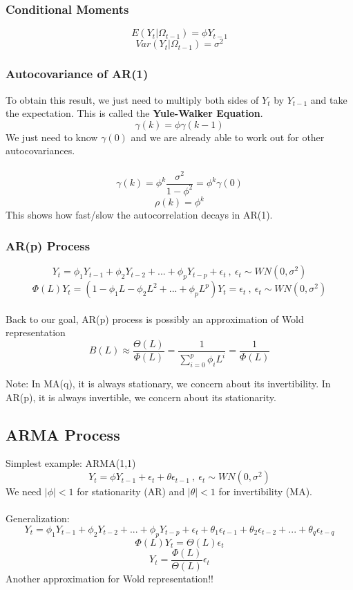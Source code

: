 \documentclass{article}
\begin{document}
\subsubsection{Conditional Moments}
$$E(Y_t|\Omega_{t-1}) = \phi Y_{t-1}$$
$$Var(Y_t|\Omega_{t-1}) = \sigma^2$$

\subsubsection{Autocovariance of AR(1)}
To obtain this result, we just need to multiply both sides of $Y_t$ by $Y_{t-1}$ and take the expectation. This is called the \textbf{Yule-Walker Equation}.
$$\gamma(k) = \phi \gamma(k-1)$$
We just need to know $\gamma(0)$ and we are already able to work out for other autocovariances.\\
\\
$$\gamma(k) = \phi^k \frac{\sigma^2}{1-\phi^2} = \phi^k \gamma(0)$$
$$\rho(k) = \phi^k$$
This shows how fast/slow the autocorrelation decays in AR(1). 

\subsubsection{AR(p) Process}
$$Y_t = \phi_1Y_{t-1} + \phi_2 Y_{t-2} + ... + \phi_p Y_{t-p} + \epsilon_t \ ,\ \epsilon_t \sim WN(0, \sigma^2)$$
$$\Phi(L)Y_t = (1-\phi_1L - \phi_2L^2 + ... + \phi_pL^p)Y_t = \epsilon_t\ ,\ \epsilon_t \sim WN(0, \sigma^2)$$\\
Back to our goal, AR(p) process is possibly an approximation of Wold representation
$$B(L) \approx \frac{\Theta(L)}{\Phi(L)} = \frac{1}{\sum_{i=0}^p \phi_i L^i} = \frac{1}{\Phi(L)}$$

Note: In MA(q), it is always stationary, we concern about its invertibility. In AR(p), it is always invertible, we concern about its stationarity.

\subsection{ARMA Process}
Simplest example: ARMA(1,1)
$$Y_t = \phi Y_{t-1} + \epsilon_t + \theta \epsilon_{t-1}\ ,\ \epsilon_t \sim WN(0, \sigma^2)$$
We need $|\phi| < 1$ for stationarity (AR) and $|\theta| < 1$ for invertibility (MA).\\
\\
Generalization:
$$Y_t = \phi_1 Y_{t-1} + \phi_2 Y_{t-2} + ... + \phi_p Y_{t-p} + \epsilon_t + \theta_1 \epsilon_{t-1} + \theta_2 \epsilon_{t-2} + ... + \theta_q \epsilon_{t-q}$$
$$\Phi(L)Y_t = \Theta(L)\epsilon_t$$
$$Y_t = \frac{\Phi(L)}{\Theta(L)}\epsilon_t$$
Another approximation for Wold representation!!
\end{document}

